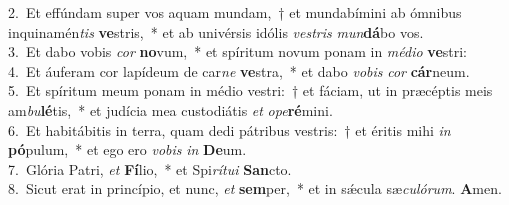 {2.~}Et effúndam super vos aquam mundam,~† et mundabímini ab ómnibus inquinamén\textit{tis} \textbf{ve}stris,~* et ab univérsis idólis \textit{ve}\textit{stris} \textit{mun}\textbf{dá}bo vos.\\
{3.~}Et dabo vobis \textit{cor} \textbf{no}vum,~* et spíritum novum ponam in \textit{mé}\textit{di}\textit{o} \textbf{ve}stri:\\
{4.~}Et áuferam cor lapídeum de car\textit{ne} \textbf{ve}stra,~* et dabo \textit{vo}\textit{bis} \textit{cor} \textbf{cár}neum.\\
{5.~}Et spíritum meum ponam in médio vestri:~† et fáciam, ut in præcéptis meis am\textit{bu}\textbf{lé}tis,~* et judícia mea custodiátis \textit{et} \textit{o}\textit{pe}\textbf{ré}mini.\\
{6.~}Et habitábitis in terra, quam dedi pátribus vestris:~† et éritis mihi \textit{in} \textbf{pó}pulum,~* et ego ero \textit{vo}\textit{bis} \textit{in} \textbf{De}um.\\
{7.~}Glória Patri, \textit{et} \textbf{Fí}lio,~* et Spi\textit{rí}\textit{tu}\textit{i} \textbf{San}cto.\\
{8.~}Sicut erat in princípio, et nunc, \textit{et} \textbf{sem}per,~* et in sǽcula sæ\textit{cu}\textit{ló}\textit{rum}. \textbf{A}men.\\
